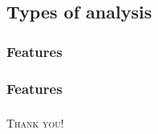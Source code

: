 \documentclass[first,firstsupp,lastsupp,handout,last,hyperref,table]{ETHclass}
\begin{document}
\subsection{Types of analysis}

\begin{frame}
\frametitle{Features}
\vspace*{-0.25cm}
\centering

\end{frame}

\begin{frame}
\frametitle{Features}
\vspace*{-0.5cm}
\centering

\end{frame}

%


\begin{frame}[plain]
\frametitle{}
\vspace{1cm}
\centering
{\LARGE
\textsc{Thank you!}
}
\end{frame}







%        
%          
\end{document}
